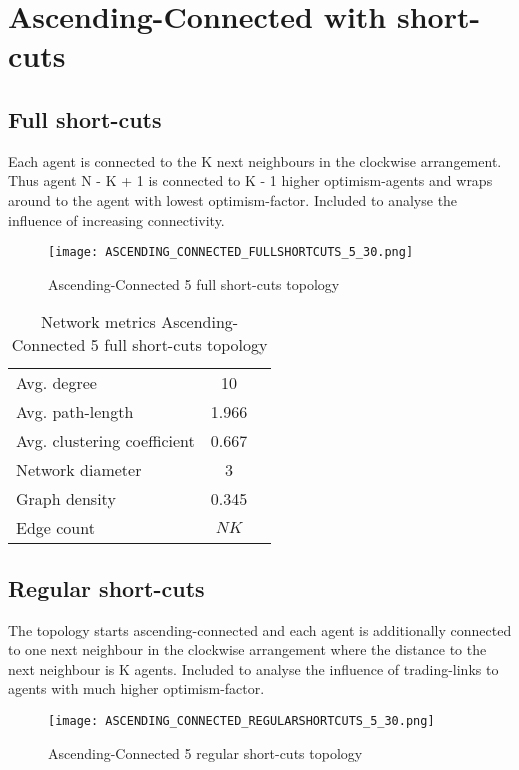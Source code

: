 \documentclass[Bachelorarbeit.tex]{subfiles}
\begin{document}
\section{Ascending-Connected with short-cuts}
\subsection{Full short-cuts}
Each agent is connected to the K next neighbours in the clockwise arrangement. Thus agent N - K + 1 is connected to K - 1 higher optimism-agents and wraps around to the agent with lowest optimism-factor.
\medskip
Included to analyse the influence of increasing connectivity.

\begin{figure}[H]
	\centering
  \texttt{[image: ASCENDING\_CONNECTED\_FULLSHORTCUTS\_5\_30.png]}
	\caption{Ascending-Connected 5 full short-cuts topology}
	\label{fig:topology_ASCENDING_CONNECTED_FULLSHORTCUTS_5_30}
\end{figure}

\begin{table}[h]
	\centering
	\caption{Network metrics Ascending-Connected 5 full short-cuts topology}
	\begin{tabular} { l c r }
		\hline
		Avg. degree & 10 \\
		Avg. path-length & 1.966 \\
		Avg. clustering coefficient & 0.667 \\
		Network diameter & 3 \\
		Graph density & 0.345 \\
		Edge count & $NK$ \\
		\hline
	\end{tabular}
\end{table}

\subsection{Regular short-cuts}
The topology starts ascending-connected and each agent is additionally connected to one next neighbour in the clockwise arrangement where the distance to the next neighbour is K agents.
\medskip
Included to analyse the influence of trading-links to agents with much higher optimism-factor.

\begin{figure}[H]
	\centering
  \texttt{[image: ASCENDING\_CONNECTED\_REGULARSHORTCUTS\_5\_30.png]}
	\caption{Ascending-Connected 5 regular short-cuts topology}
	\label{fig:topology_ASCENDING_CONNECTED_REGULARSHORTCUTS_5_30}
\end{figure}
\end{document}
